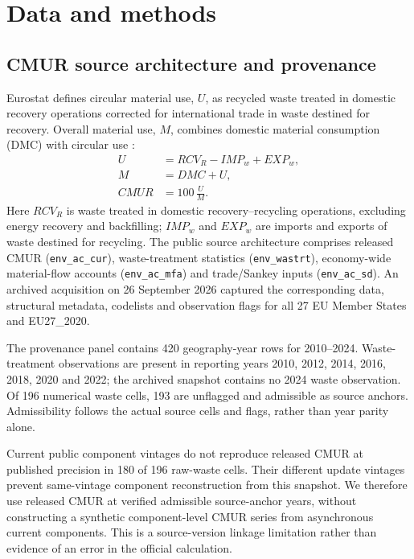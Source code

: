 \section{Data and methods}

\subsection{CMUR source architecture and provenance}

Eurostat defines circular material use, $U$, as recycled waste treated in domestic recovery operations corrected for international trade in waste destined for recovery. Overall material use, $M$, combines domestic material consumption (DMC) with circular use \parencite{Eurostat2018,EurostatMetadata2026}:
\begin{align}
U &= RCV_R - IMP_w + EXP_w, \\
M &= DMC + U, \\
CMUR &= 100\,\frac{U}{M}.
\end{align}
Here $RCV_R$ is waste treated in domestic recovery--recycling operations, excluding energy recovery and backfilling; $IMP_w$ and $EXP_w$ are imports and exports of waste destined for recycling. The public source architecture comprises released CMUR (\texttt{env\_ac\_cur}), waste-treatment statistics (\texttt{env\_wastrt}), economy-wide material-flow accounts (\texttt{env\_ac\_mfa}) and trade/Sankey inputs (\texttt{env\_ac\_sd}). An archived acquisition on 26 September 2026 captured the corresponding data, structural metadata, codelists and observation flags for all 27 EU Member States and EU27\_2020.

The provenance panel contains 420 geography-year rows for 2010--2024. Waste-treatment observations are present in reporting years 2010, 2012, 2014, 2016, 2018, 2020 and 2022; the archived snapshot contains no 2024 waste observation. Of 196 numerical waste cells, 193 are unflagged and admissible as source anchors. Admissibility follows the actual source cells and flags, rather than year parity alone.

Current public component vintages do not reproduce released CMUR at published precision in 180 of 196 raw-waste cells. Their different update vintages prevent same-vintage component reconstruction from this snapshot. We therefore use released CMUR at verified admissible source-anchor years, without constructing a synthetic component-level CMUR series from asynchronous current components. This is a source-version linkage limitation rather than evidence of an error in the official calculation.

